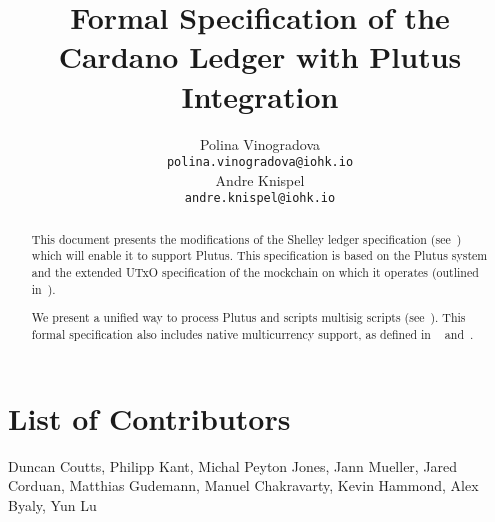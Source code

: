 

\cleardoublepage
\renewcommand{\thepage}{\arabic{page}}
\setcounter{page}{1}

\title{Formal Specification of the Cardano Ledger with Plutus
Integration}

\author{
   Polina Vinogradova \\ {\small \texttt{polina.vinogradova@iohk.io}} \\
   Andre Knispel \\ {\small \texttt{andre.knispel@iohk.io}} \\
   }

\date{}

\maketitle

\begin{abstract}
This document presents the modifications of the Shelley ledger
specification
(see~\cite{shelley_spec}) which will enable it to support Plutus.
This specification is based on the Plutus system and the extended
UTxO specification of the mockchain on which it operates
(outlined in~\cite{plutus_eutxo}).

We present a unified way to process Plutus and scripts multisig scripts
(see~\cite{multi_sig}). This formal specification also includes native multicurrency support,
as defined in
~\cite{multi_currency} and~\cite{formal_multicur}.
\end{abstract}

\section*{List of Contributors}
\label{acknowledgements}

Duncan Coutts,
Philipp Kant,
Michal Peyton Jones,
Jann Mueller,
Jared Corduan,
Matthias Gudemann,
Manuel Chakravarty,
Kevin Hammond,
Alex Byaly,
Yun Lu

